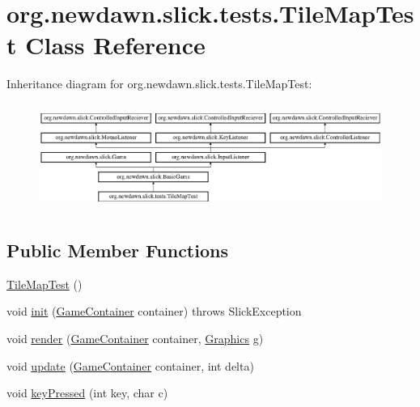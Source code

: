 \hypertarget{classorg_1_1newdawn_1_1slick_1_1tests_1_1_tile_map_test}{}\section{org.\+newdawn.\+slick.\+tests.\+Tile\+Map\+Test Class Reference}
\label{classorg_1_1newdawn_1_1slick_1_1tests_1_1_tile_map_test}
Inheritance diagram for org.\+newdawn.\+slick.\+tests.\+Tile\+Map\+Test\+:\begin{figure}[H]
\begin{center}
\leavevmode
\includegraphics[height=3.522012cm]{classorg_1_1newdawn_1_1slick_1_1tests_1_1_tile_map_test}
\end{center}
\end{figure}
\subsection*{Public Member Functions}
\begin{DoxyCompactItemize}
\item 
\mbox{\hyperlink{classorg_1_1newdawn_1_1slick_1_1tests_1_1_tile_map_test_a495420c73e623307230d768ea2883759}{Tile\+Map\+Test}} ()
\item 
void \mbox{\hyperlink{classorg_1_1newdawn_1_1slick_1_1tests_1_1_tile_map_test_ac367239ef107597b8ca503bbd5956c87}{init}} (\mbox{\hyperlink{classorg_1_1newdawn_1_1slick_1_1_game_container}{Game\+Container}} container)  throws Slick\+Exception 
\item 
void \mbox{\hyperlink{classorg_1_1newdawn_1_1slick_1_1tests_1_1_tile_map_test_a6d57608e6ac0a82eb5140c26925cde48}{render}} (\mbox{\hyperlink{classorg_1_1newdawn_1_1slick_1_1_game_container}{Game\+Container}} container, \mbox{\hyperlink{classorg_1_1newdawn_1_1slick_1_1_graphics}{Graphics}} g)
\item 
void \mbox{\hyperlink{classorg_1_1newdawn_1_1slick_1_1tests_1_1_tile_map_test_a919f1dbc82723fa715959c1d49cd802f}{update}} (\mbox{\hyperlink{classorg_1_1newdawn_1_1slick_1_1_game_container}{Game\+Container}} container, int delta)
\item 
void \mbox{\hyperlink{classorg_1_1newdawn_1_1slick_1_1tests_1_1_tile_map_test_aed6237171efed7f68d0dbedbbf715e7a}{key\+Pressed}} (int key, char c)
\end{DoxyCompactItemize}
